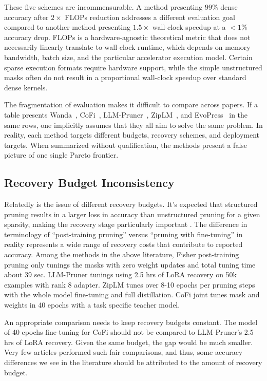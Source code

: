 These five schemes are incommensurable. A method presenting $99\%$ dense accuracy after $2\times$ FLOPs reduction addresses a different evaluation goal compared to another method presenting $1.5\times$ wall-clock speedup at a $<1\%$ accuracy drop. FLOPs is a hardware-agnostic theoretical metric that does not necessarily linearly translate to wall-clock runtime, which depends on memory bandwidth, batch size, and the particular accelerator execution model. Certain sparse execution formats require hardware support, while the simple unstructured masks often do not result in a proportional wall-clock speedup over standard dense kernels.

The fragmentation of evaluation makes it difficult to compare across papers. If a table presents Wanda~\cite{sun2023simple}, CoFi~\cite{xia2022structured}, LLM-Pruner~\cite{ma2023llmpruner}, ZipLM~\cite{kurtic2023ziplm}, and EvoPress~\cite{evopress2024} in the same rows, one implicitly assumes that they all aim to solve the same problem. In reality, each method targets different budgets, recovery schemes, and deployment targets. When summarized without qualification, the methods present a false picture of one single Pareto frontier.

\subsection{Recovery Budget Inconsistency}
\label{subsec:recovery}

Relatedly is the issue of different recovery budgets. It's expected that structured pruning results in a larger loss in accuracy than unstructured pruning for a given sparsity, making the recovery stage particularly important \cite{xu2026lightweight}. The difference in terminology of ``post-training pruning'' versus ``pruning with fine-tuning'' in reality represents a wide range of recovery costs that contribute to reported accuracy. Among the methods in the above literature, Fisher post-training pruning only tunings the masks with zero weight updates and total tuning time about 39 sec. LLM-Pruner tunings using 2.5 hrs of LoRA recovery on 50k examples with rank 8 adapter. ZipLM tunes over 8-10 epochs per pruning steps with the whole model fine-tuning and full distillation. CoFi joint tunes mask and weights in 40 epochs with a task specific teacher model.

An appropriate comparison needs to keep recovery budgets constant. The model of 40 epochs fine-tuning for CoFi should not be compared to LLM-Pruner's 2.5 hrs of LoRA recovery. Given the same budget, the gap would be much smaller. Very few articles performed such fair comparisons, and thus, some accuracy differences we see in the literature should be attributed to the amount of recovery budget.

